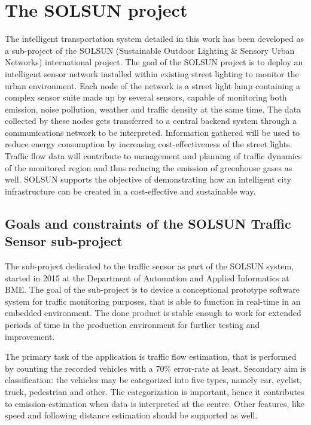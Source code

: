 \section{The SOLSUN project}
The intelligent transportation system detailed in this work has been developed as a sub-project of the SOLSUN (Sustainable Outdoor Lighting \& Sensory Urban Networks) international project\cite{SOLSUN}.
The goal of the SOLSUN project is to deploy an intelligent sensor network installed within existing street lighting to monitor the urban environment.
Each node of the network is a street light lamp containing a complex sensor suite made up by several sensors, capable of monitoring both emission, noise pollution, weather and traffic density at the same time.
The data collected by these nodes gets transferred to a central backend system through a communications network to be interpreted.
Information gathered will be used to reduce energy consumption by increasing cost-effectiveness of the street lights.
Traffic flow data will contribute to management and planning of traffic dynamics of the monitored region and thus reducing the emission of greenhouse gases as well.
SOLSUN supports the objective of demonstrating how an intelligent city infrastructure can be created in a cost-effective and sustainable way.

\subsection{Goals and constraints of the SOLSUN Traffic Sensor sub-project}
The sub-project dedicated to the traffic sensor as part of the SOLSUN system, started in 2015 at the Department of Automation and Applied Informatics at BME\cite{SOLSUN_BME}.
The goal of the sub-project is to device a conceptional prototype software system for traffic monitoring purposes, that is able to function in real-time in an embedded environment.
The done product is stable enough to work for extended periods of time in the production environment for further testing and improvement.

The primary task of the application is traffic flow estimation, that is performed by counting the recorded vehicles with a 70\% error-rate at least.
Secondary aim is classification: the vehicles may be categorized into five types, namely car, cyclist, truck, pedestrian and other.
The categorization is important, hence it contributes to emission-estimation when data is interpreted at the centre\cite{Csorba2016}.
Other features, like speed and following distance estimation should be supported as well.

